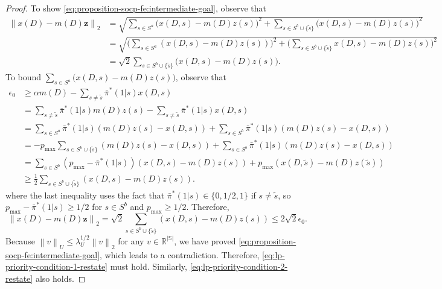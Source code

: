 \documentclass[11pt,letterpaper]{article}
\theoremstyle{plain}
\theoremstyle{definition}
\theoremstyle{remark}
\newcommand{\norm}[1]{\left\lVert#1\right\rVert}
\newcommand{\R}{\mathbb{R}}
\newcommand{\ve}[1]{\bm{#1}}
\newcommand{\sspa}{\mathbb{S}}
\newcommand{\pibar}{{\sysbar{\pi}}}
\newcommand{\pibs}{{\pibar^*}}
\newcommand{\sysbar}[1]{\bar{#1}}
\newcommand{\umat}{U}
\newcommand{\lamu}{\lambda_\umat}
\newcommand{\sneu}{\tilde{s}}
\begin{document}
\begin{proof}
    To show \eqref{eq:proposition-socp-fe:intermediate-goal}, observe that 
    \begin{align*}
        \norm{x(D) - m(D)\ve{z}}_2 
        &= \sqrt{\sum_{s\in S^a} \big(x(D, s) - m(D) z(s)\big)^2 + \sum_{s\in S^b\cup \{\sneu\}} \big(x(D, s) - m(D) z(s)\big)^2} \\
        &= \sqrt{ \big(\sum_{s\in S^a} (x(D, s) - m(D) z(s))\big)^2 +  \big(\sum_{s\in S^b\cup \{\sneu\}}x(D, s) - m(D) z(s)\big)^2} \\
        &= \sqrt{2} \sum_{s\in S^b \cup \{\sneu\}} \big(x(D, s) - m(D) z(s)\big). 
    \end{align*}
    To bound $\sum_{s\in S^a} \big(x(D, s) - m(D) z(s)\big)$, observe that 
    \begin{align*}
        \epsilon_0 &\geq \alpha m(D) - \sum_{s\neq \sneu} \pibs(1|s) x(D, s) \\
        &= \sum_{s\neq \sneu} \pibs(1|s) m(D) z(s) - \sum_{s\neq \sneu} \pibs(1|s) x(D, s) \\
        &= \sum_{s\in S^a} \pibs(1|s) (m(D) z(s) - x(D, s)) + \sum_{s\in S^b} \pibs(1|s) (m(D) z(s) - x(D, s)) \\
        &= - p_{\max} \sum_{s\in S^b\cup \{\sneu\}}(m(D) z(s) - x(D, s)) + \sum_{s\in S^b} \pibs(1|s) (m(D) z(s) - x(D, s)) \\
        &= \sum_{s\in S^b} (p_{\max} - \pibs(1|s)) (x(D, s) - m(D) z(s)) + p_{\max} (x(D, \sneu) - m(D) z(\sneu) )\\
        &\geq \frac{1}{2} \sum_{s\in S^b \cup \{\sneu\}} (x(D, s) - m(D)z(s)).
    \end{align*}
    where the last inequality uses the fact that $\pibs(1|s) \in \{0,1/2, 1\}$ if $s\neq \sneu$, so $p_{\max} - \pibs(1|s) \geq 1/2$ for $s\in S^b$ and $p_{\max} \geq 1/2$. Therefore, 
    \[
        \norm{x(D) - m(D)\ve{z}}_2  = \sqrt{2} \sum_{s\in S^b \cup \{\sneu\}} (x(D, s) - m(D)z(s)) \leq 2\sqrt{2}\epsilon_0. 
    \]
    Because $\norm{v}_\umat \leq \lamu^{1/2}\norm{v}_2$ for any $v\in \R^{|\sspa|}$, we have proved \eqref{eq:proposition-socp-fe:intermediate-goal}, which leads to a contradiction. 
    Therefore, \eqref{eq:lp-priority-condition-1-restate} must hold. Similarly, \eqref{eq:lp-priority-condition-2-restate} also holds. 
\end{proof}
\end{document}
